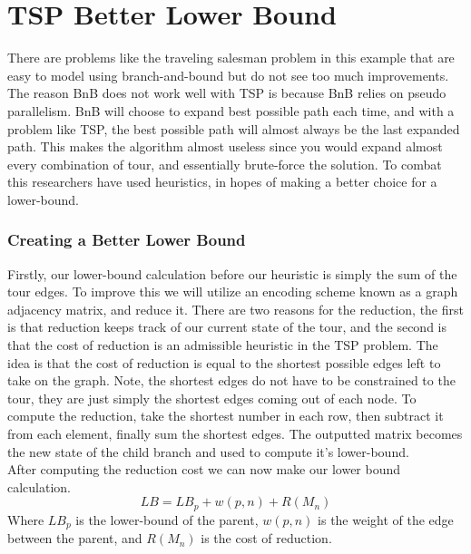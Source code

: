 
\section{TSP Better Lower Bound}
    There are problems like the traveling salesman problem in this example
    that are easy to model using branch-and-bound but do not see too much improvements.
    The reason BnB does not work well with TSP is because BnB relies on pseudo
    parallelism. BnB will choose to expand best possible path each time, and 
    with a problem like TSP, the best possible path will almost always be the 
    last expanded path. This makes the algorithm almost useless since you 
    would expand almost every combination of tour, and essentially brute-force the solution.
    To combat this researchers have used heuristics, in hopes of making a better
    choice for a lower-bound.

    \subsubsection{Creating a Better Lower Bound}
    Firstly, our lower-bound calculation before our heuristic is simply the sum 
    of the tour edges. To improve this we will utilize an encoding scheme known as 
    a graph adjacency matrix, and reduce it. There are two reasons for the reduction, 
    the first is that reduction keeps track of our current state of the tour, and the second
    is that the cost of reduction is an admissible heuristic in the TSP problem.
    The idea is that the cost of reduction is equal to the shortest possible edges left to
    take on the graph. Note, the shortest edges do not have to be constrained to the tour, they
    are just simply the shortest edges coming out of each node. To compute the reduction, take the
    shortest number in each row, then subtract it from each element, finally sum the shortest edges.
    The outputted matrix becomes the new state of the child branch and used to compute it's lower-bound.\\

    After computing the reduction cost we can now make our lower bound calculation.
    \begin{equation}
        LB = LB_p + w(p, n) + R(M_n)
    \end{equation}
    Where $LB_p$ is the lower-bound of the parent, $w(p, n)$ is the weight of the edge
    between the parent, and $R(M_n)$ is the cost of reduction. 
    
